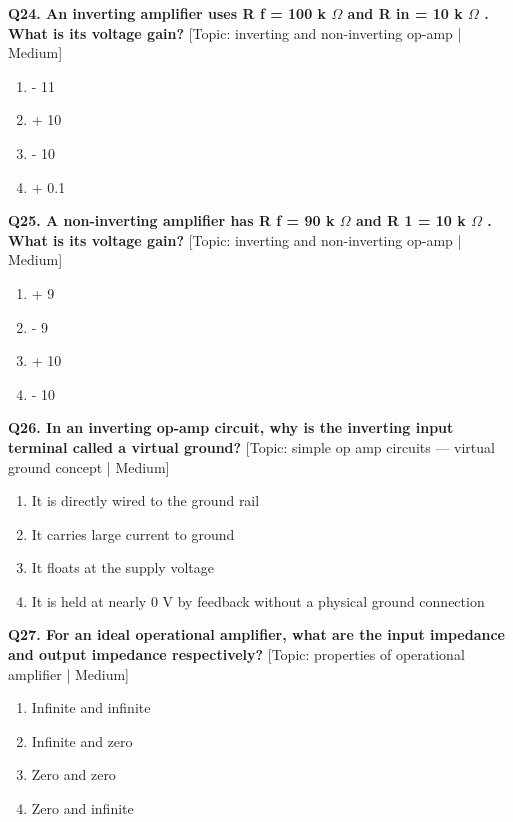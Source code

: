 \noindent\textbf{Q24. An inverting amplifier uses R f = 100 k $\Omega$ and R in = 10 k $\Omega$ . What is its voltage gain?} \hfill [Topic: inverting and non-inverting op-amp | Medium]
\begin{enumerate}[label=(\alph*),topsep=2pt,itemsep=1pt,partopsep=0pt,parsep=0pt]
    \item {- 11}
    \item {+ 10}
    \item {- 10}
    \item {+ 0.1}
\end{enumerate}
\vspace{2mm}

\noindent\textbf{Q25. A non-inverting amplifier has R f = 90 k $\Omega$ and R 1 = 10 k $\Omega$ . What is its voltage gain?} \hfill [Topic: inverting and non-inverting op-amp | Medium]
\begin{enumerate}[label=(\alph*),topsep=2pt,itemsep=1pt,partopsep=0pt,parsep=0pt]
    \item {+ 9}
    \item {- 9}
    \item {+ 10}
    \item {- 10}
\end{enumerate}
\vspace{2mm}

\noindent\textbf{Q26. In an inverting op-amp circuit, why is the inverting input terminal called a virtual ground?} \hfill [Topic: simple op amp circuits --- virtual ground concept | Medium]
\begin{enumerate}[label=(\alph*),topsep=2pt,itemsep=1pt,partopsep=0pt,parsep=0pt]
    \item {It is directly wired to the ground rail}
    \item {It carries large current to ground}
    \item {It floats at the supply voltage}
    \item {It is held at nearly 0 V by feedback without a physical ground connection}
\end{enumerate}
\vspace{2mm}

\noindent\textbf{Q27. For an ideal operational amplifier, what are the input impedance and output impedance respectively?} \hfill [Topic: properties of operational amplifier | Medium]
\begin{enumerate}[label=(\alph*),topsep=2pt,itemsep=1pt,partopsep=0pt,parsep=0pt]
    \item {Infinite and infinite}
    \item {Infinite and zero}
    \item {Zero and zero}
    \item {Zero and infinite}
\end{enumerate}
\vspace{2mm}

